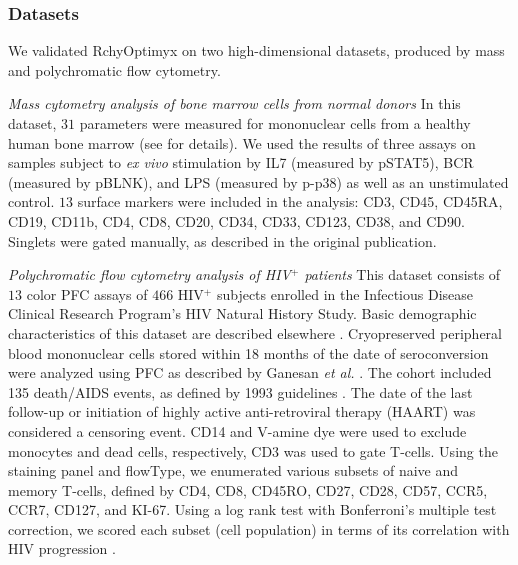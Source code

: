 


\subsubsection{Datasets}

We validated RchyOptimyx on two high-dimensional datasets, produced by mass and polychromatic flow cytometry.

\emph{Mass cytometry analysis of bone marrow cells from normal donors}
In this dataset, $31$ parameters were measured for mononuclear cells from a healthy human bone marrow (see  \cite{bendall2011single} for details).
We used the results of three assays on samples subject to \emph{ex vivo} stimulation by IL7 (measured by pSTAT5), BCR (measured by pBLNK), and LPS (measured by p-p38) as well as an unstimulated control.
$13$ surface markers were included in the analysis: CD3, CD45, CD45RA, CD19, CD11b, CD4, CD8, CD20, CD34, CD33, CD123, CD38, and CD90.
Singlets were gated manually, as described in the original publication.



\emph{Polychromatic flow cytometry analysis of HIV$^+$ patients}
This dataset consists of $13$ color PFC assays of $466$ HIV$^+$ subjects enrolled in the Infectious Disease Clinical Research Program's HIV Natural History Study.
Basic demographic characteristics of this dataset are described elsewhere \cite{weintrob2008increasing}.
Cryopreserved peripheral blood mononuclear cells stored within 18 months of the date of seroconversion were analyzed using PFC as described by Ganesan \emph{et al.} \cite{Ganesan2010Immunologic}. 
The cohort included 135 death/AIDS events, as defined by 1993 guidelines \cite{castro1992revised}.
The date of the last follow-up or initiation of highly active anti-retroviral therapy (HAART) was considered a censoring event.
CD14 and V-amine dye were used to exclude monocytes and dead cells, respectively, CD3 was used to gate T-cells.
Using the staining panel and flowType, we enumerated various subsets of naive and memory T-cells, defined by CD4, CD8, CD45RO, CD27, CD28, CD57, CCR5, CCR7, CD127, and KI-67.
Using a log rank test with Bonferroni's multiple test correction, we scored each subset (cell population) in terms of its correlation with HIV progression \cite{Aghaeepour2012}.

